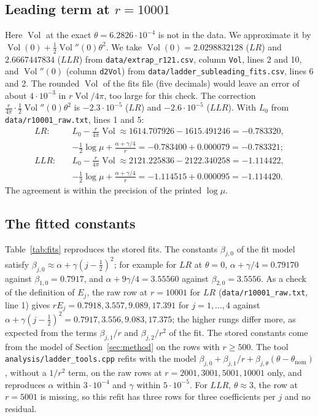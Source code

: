 \documentclass[11pt]{amsart}
\theoremstyle{definition}
\theoremstyle{remark}
\newcommand{\Vol}{\operatorname{Vol}}
\begin{document}
\subsection{Leading term at $r = 10001$}
Here $\Vol$ at the exact $\theta = 6.2826\cdot10^{-4}$ is not in the data. We
approximate it by $\Vol(0) + \frac12\Vol''(0)\theta^2$. We take $\Vol(0) =
2.0298832128$ ($LR$) and $2.6667447834$ ($LLR$) from \texttt{data/extrap\_r121.csv},
column \texttt{Vol}, lines 2 and 10, and $\Vol''(0)$ (column \texttt{d2Vol}) from
\texttt{data/ladder\_subleading\_fits.csv}, lines 6 and 2. The rounded $\Vol$ of the
fits file (five decimals) would leave an error of about $4\cdot10^{-3}$ in
$r\Vol/4\pi$, too large for this check. The correction
$\frac{r}{4\pi}\cdot\frac12\Vol''(0)\theta^2$ is $-2.3\cdot10^{-5}$ ($LR$) and
$-2.6\cdot10^{-5}$ ($LLR$).
With $L_0$ from \texttt{data/r10001\_raw.txt}, lines 1 and 5:
\begin{align*}
LR:\quad & L_0 - \tfrac{r}{4\pi}\Vol \approx 1614.707926 - 1615.491246 = -0.783320,\\
& -\tfrac12\log\mu + \tfrac{\alpha + \gamma/4}{r} = -0.783400 + 0.000079 = -0.783321;\\
LLR:\quad & L_0 - \tfrac{r}{4\pi}\Vol \approx 2121.225836 - 2122.340258 = -1.114422,\\
& -\tfrac12\log\mu + \tfrac{\alpha + \gamma/4}{r} = -1.114515 + 0.000095 = -1.114420.
\end{align*}
The agreement is within the precision of the printed $\log\mu$.

\subsection{The fitted constants}
Table~\ref{tab:fits} reproduces the stored fits. The constants $\beta_{j,0}$ of the
fit model satisfy $\beta_{j,0} \approx \alpha + \gamma(j-\frac12)^2$; for example for
$LR$ at $\theta = 0$, $\alpha + \gamma/4 = 0.79170$ against $\beta_{1,0} = 0.7917$,
and $\alpha + 9\gamma/4 = 3.55560$ against $\beta_{2,0} = 3.5556$. As a check of the
definition of
$E_j$, the raw row at $r = 10001$ for $LR$ (\texttt{data/r10001\_raw.txt}, line 1) gives
$rE_j = 0.7918, 3.557, 9.089, 17.391$ for $j = 1, \dots, 4$ against
$\alpha + \gamma(j-\frac12)^2 = 0.7917, 3.556, 9.083, 17.375$; the higher rungs differ
more, as expected from the terms $\beta_{j,1}/r$ and $\beta_{j,2}/r^2$ of the fit.
The stored constants come from the model of Section~\ref{sec:method} on the rows with
$r \ge 500$. The tool \texttt{analysis/ladder\_tools.cpp} refits with the model
$\beta_{j,0} + \beta_{j,1}/r + \beta_{j,\theta}(\theta - \theta_{\mathrm{nom}})$,
without a $1/r^2$ term, on the raw rows at $r = 2001, 3001, 5001, 10001$ only, and
reproduces $\alpha$ within $3\cdot10^{-4}$ and $\gamma$ within $5\cdot10^{-5}$. For
$LLR$, $\theta \approx 3$, the row at $r = 5001$ is missing, so this refit has three
rows for three coefficients per $j$ and no residual.
\end{document}
